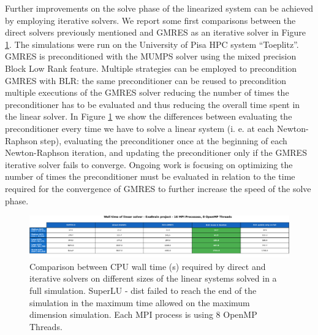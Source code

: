 \documentclass[a4paper,12pt]{article}
\begin{document}
Further improvements on the solve phase of the linearized system can be achieved by employing iterative solvers. We report some first comparisons between the direct solvers previously mentioned and GMRES as an iterative solver in Figure \ref{fig:fau-wall-times}. The simulations were run on the University of Pisa HPC system “Toeplitz”. GMRES is preconditioned with the MUMPS solver using the mixed precision Block Low Rank feature. Multiple strategies can be employed to precondition GMRES with BLR: the same preconditioner can be reused to precondition multiple executions of the GMRES solver reducing the number of times the preconditioner has to be evaluated and thus reducing the overall time spent in the linear solver. In Figure \ref{fig:fau-wall-times} we show the differences between evaluating the preconditioner every time we have to solve a linear system (i. e. at each Newton-Raphson step), evaluating the preconditioner once at the beginning of each Newton-Raphson iteration, and updating the preconditioner only if the GMRES iterative solver fails to converge. Ongoing work is focusing on optimizing the number of times the preconditioner must be evaluated in relation to the time required for the convergence of GMRES to further increase the speed of the solve phase.

\begin{figure}
  \centering

  \includegraphics[width=\textwidth]{fau-wall-times.png}

  \caption{Comparison between CPU wall time (s) required by direct and iterative solvers on different sizes of the linear systems solved in a full simulation. SuperLU - dist failed to reach the end of the simulation in the maximum time allowed on the maximum dimension simulation. Each MPI process is using 8 OpenMP Threads.}
  \label{fig:fau-wall-times}
\end{figure}
\end{document}
